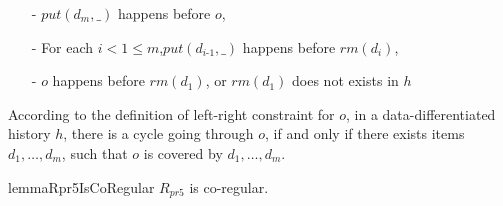 \documentclass{llncs}
\begin{document}
\begin{itemize}
\setlength{\itemsep}{0.5pt}
\item[-] $\textit{put}(d_m,\_)$ happens before $o$,

\item[-] For each $i < 1 \leq m$,$\textit{put}(d_{\textit{i-1}},\_)$ happens before $\textit{rm}(d_i)$,

\item[-] $o$ happens before $\textit{rm}(d_1)$, or $\textit{rm}(d_1)$ does not exists in $h$
\end{itemize}

According to the definition of left-right constraint for $o$, in a data-differentiated history $h$, there is a cycle going through $o$, if and only if there exists items $d_1,\ldots,d_m$, such that $o$ is covered by $d_1,\ldots,d_m$.


\begin{restatable}{lemma}{Rpr5IsCoRegular}
\label{lemma:Rpr1 5s co-regular}
$R_{\textit{pr5}}$ is co-regular.
\end{restatable}
\end{document}
